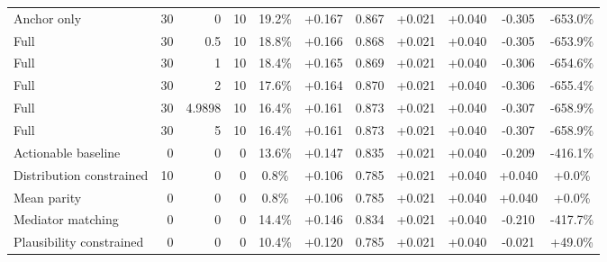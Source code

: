 \begin{table}[htbp]
\begin{tabular}{lrrrccccccc}
Anchor only & 30 & 0 & 10 & 19.2\% & +0.167 & 0.867 & +0.021 & +0.040 & -0.305 & -653.0\% \\
Full & 30 & 0.5 & 10 & 18.8\% & +0.166 & 0.868 & +0.021 & +0.040 & -0.305 & -653.9\% \\
Full & 30 & 1 & 10 & 18.4\% & +0.165 & 0.869 & +0.021 & +0.040 & -0.306 & -654.6\% \\
Full & 30 & 2 & 10 & 17.6\% & +0.164 & 0.870 & +0.021 & +0.040 & -0.306 & -655.4\% \\
Full & 30 & 4.9898 & 10 & 16.4\% & +0.161 & 0.873 & +0.021 & +0.040 & -0.307 & -658.9\% \\
Full & 30 & 5 & 10 & 16.4\% & +0.161 & 0.873 & +0.021 & +0.040 & -0.307 & -658.9\% \\
Actionable baseline & 0 & 0 & 0 & 13.6\% & +0.147 & 0.835 & +0.021 & +0.040 & -0.209 & -416.1\% \\
Distribution constrained & 10 & 0 & 0 & 0.8\% & +0.106 & 0.785 & +0.021 & +0.040 & +0.040 & +0.0\% \\
Mean parity & 0 & 0 & 0 & 0.8\% & +0.106 & 0.785 & +0.021 & +0.040 & +0.040 & +0.0\% \\
Mediator matching & 0 & 0 & 0 & 14.4\% & +0.146 & 0.834 & +0.021 & +0.040 & -0.210 & -417.7\% \\
Plausibility constrained & 0 & 0 & 0 & 10.4\% & +0.120 & 0.785 & +0.021 & +0.040 & -0.021 & +49.0\% \\
\bottomrule
\end{tabular}
\end{table}